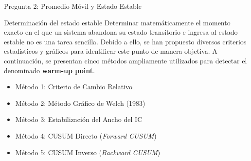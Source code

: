 \documentclass[aspectratio=169, 10pt]{beamer}
\begin{document}
\begin{frame}{Pregunta 2: Promedio Móvil y Estado Estable}
	\begin{exampleblock}{Determinación del estado estable}
		\justifying
		Determinar matemáticamente el momento exacto en el que un sistema abandona su estado
		transitorio e ingresa al estado estable no es una tarea sencilla. Debido a ello, se han
		propuesto diversos criterios estadísticos y gráficos para identificar este punto de manera
		objetiva. A continuación, se presentan cinco métodos ampliamente utilizados para detectar
		el denominado \textbf{warm-up point}.\\[6pt]
		\begin{itemize}
			\item Método 1: Criterio de Cambio Relativo
			\item Método 2: Método Gráfico de Welch (1983)
			\item Método 3: Estabilización del Ancho del IC
			\item Método 4: CUSUM Directo (\textit{Forward CUSUM})
			\item Método 5: CUSUM Inverso (\textit{Backward CUSUM})
		\end{itemize}
	\end{exampleblock}
\end{frame}
\end{document}
